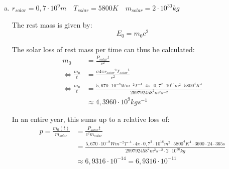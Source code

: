 \documentclass[a4paper,german,12pt]{scrartcl}
\begin{document}
\begin{enumerate}[(a)]
\item $r_{solar}=0,7\cdot 10^9m \quad T_{solar}=5800K \quad m_{solar}=2\cdot 10^{30}kg$

The rest mass is given by:
\begin{equation*}
E_0=m_0c^2
\end{equation*}

The solar loss of rest mass per time can thus be calculated:
\begin{align*}
m_0&=\frac{P_{solar}t}{c^2}\\
\Leftrightarrow \frac{m_0}{t}&=\frac{\sigma 4\pi {r_{solar}}^2{T_{solar}}^4}{c^2}\\
\Leftrightarrow \frac{m_0}{t}&=\frac{5,670\cdot 10^{-8}Wm^{-2}T^{-4}\cdot 4\pi \cdot 0,7^2\cdot 10^{18}m^2 \cdot 5800^4 K^4}{299792458^2m^2s^{-2}}\\
&\approx 4,3960 \cdot 10^{9}kgs^{-1}
\end{align*}

In an entire year, this sums up to a relative loss of:
\begin{align*}
p = \frac{m_0(t)}{m_{solar}} &= \frac{P_{solar}t}{c^2m_{solar}}\\
&=\frac{5,670\cdot 10^{-8}Wm^{-2}T^{-4}\cdot 4\pi \cdot 0,7^2\cdot 10^{18}m^2 \cdot 5800^4 K^4 \cdot 3600\cdot 24\cdot 365s}{299792458^2m^2s^{-2}\cdot 2\cdot 10^{30}kg}\\ 
&\approx 6,9316 \cdot 10^{-14}=6,9316\cdot 10^{-11} %
\end{align*}

\end{enumerate}
\end{document}

